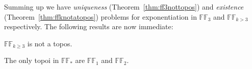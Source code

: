 Summing up we have \emph{uniqueness} (Theorem~\ref{thm:ff3nottopos}) and \emph{existence} (Theorem~\ref{thm:ffknotatopos}) problems for exponentiation in $\mathbb{FF}_3$ and $\mathbb{FF}_{k> 3}$ respectively. The following results are now immediate:
 
 \begin{cor}
 	$\mathbb{FF}_{k\geq3}$ is not a topos.
 \end{cor}
 
 \begin{cor}
 	The only topoi in $\mathbb{FF}_*$ are $\mathbb{FF}_1 $ and $\mathbb{FF}_2$.
 \end{cor}



	\newpage
${}$ \newpage













